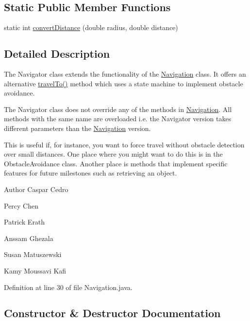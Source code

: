 \subsection*{Static Public Member Functions}
\begin{DoxyCompactItemize}
\item 
static int \hyperlink{classca_1_1mcgill_1_1ecse211_1_1project_1_1_navigation_ac9e260bcd619ffa4820d7d0de7ea1c12}{convert\+Distance} (double radius, double distance)
\end{DoxyCompactItemize}


\subsection{Detailed Description}
The Navigator class extends the functionality of the \hyperlink{classca_1_1mcgill_1_1ecse211_1_1project_1_1_navigation}{Navigation} class. It offers an alternative \hyperlink{classca_1_1mcgill_1_1ecse211_1_1project_1_1_navigation_ad89b3dd084d81b4ec4d89ea73ba13eaa}{travel\+To()} method which uses a state machine to implement obstacle avoidance.

The Navigator class does not override any of the methods in \hyperlink{classca_1_1mcgill_1_1ecse211_1_1project_1_1_navigation}{Navigation}. All methods with the same name are overloaded i.\+e. the Navigator version takes different parameters than the \hyperlink{classca_1_1mcgill_1_1ecse211_1_1project_1_1_navigation}{Navigation} version.

This is useful if, for instance, you want to force travel without obstacle detection over small distances. One place where you might want to do this is in the Obstacle\+Avoidance class. Another place is methods that implement specific features for future milestones such as retrieving an object.

\begin{DoxyAuthor}{Author}
Caspar Cedro 

Percy Chen 

Patrick Erath 

Anssam Ghezala 

Susan Matuszewski 

Kamy Moussavi Kafi 
\end{DoxyAuthor}


Definition at line 30 of file Navigation.\+java.



\subsection{Constructor \& Destructor Documentation}
\mbox{\label{classca_1_1mcgill_1_1ecse211_1_1project_1_1_navigation_aaee14b67c392ddd951e3ce21224c3e56}} 
